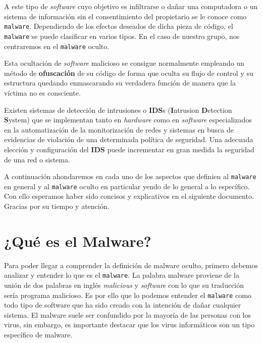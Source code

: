 \documentclass[12pt]{article}
\newcommand{\newpar} {
    \vskip 0.5cm
}
\begin{document}
        A este tipo de \textit{software} cuyo objetivo es infiltrarse o dañar una computadora o un sistema de información sin el consentimiento del propietario se le conoce como 
        \texttt{malware}. Dependiendo de los efectos deseados de dicha pieza de código, el \texttt{malware} se puede clasificar en varios tipos. En el caso de nuestro grupo, nos centraremos en el \texttt{malware} oculto.

        \newpar

        Esta ocultación de \textit{software} malicioso se consigue normalmente empleando un método de \textbf{ofuscación} de su código de forma que oculta su flujo de control y su estructura quedando enmascarando su verdadera función de manera que la víctima no es consciente.

        \newpar

        Existen sistemas de detección de intrusiones o \textbf{IDS}s (\textbf{I}ntrusion \textbf{D}etection \textbf{S}ystem) que se implementan tanto en \textit{hardware} como en \textit{software} especializados en la automatización de la monitorización de redes y sistemas en busca de evidencias de violación de una determinada política de seguridad. Una adecuada elección y configuración del \textbf{IDS} puede incrementar en gran medida la seguridad de una red o sistema.

        \newpar

        A continuación ahondaremos en cada uno de los aspectos que definien al \texttt{malware} en general y al \texttt{malware} oculto en particular yendo de lo general a lo específico. Con ello esperamos haber sido concisos y explicativos en el siguiente documento. Gracias por su tiempo y atención.

    \section{¿Qué es el Malware?}
        Para poder llegar a comprender la definición de malware oculto, primero debemos analizar y entender lo que es el \texttt{malware}. La palabra malware proviene de la unión de dos palabras en inglés \textit{malicious} y \textit{software} con lo que su traducción sería programa malicioso. Es por ello que lo podemos entender el \texttt{malware} como todo tipo de software que ha sido creado con la intención de dañar cualquier sistema. El malware suele ser confundido por la mayoría de las personas con los virus, sin embargo, es importante destacar que los virus informáticos son un tipo específico de malware.
\end{document}
